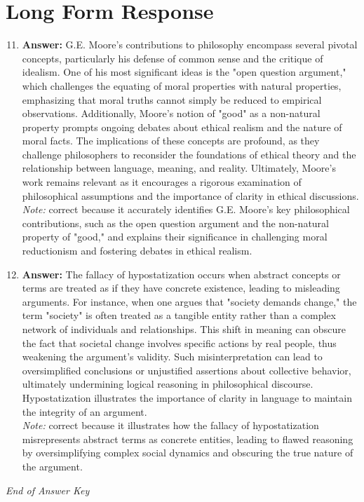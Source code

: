 \documentclass[12pt]{article}
\begin{document}
\section*{Long Form Response}
\begin{enumerate}[label=\arabic*.]
\setcounter{enumi}{10}
\item \textbf{Answer:} G.E. Moore's contributions to philosophy encompass several pivotal concepts, particularly his defense of common sense and the critique of idealism. One of his most significant ideas is the "open question argument," which challenges the equating of moral properties with natural properties, emphasizing that moral truths cannot simply be reduced to empirical observations. Additionally, Moore's notion of "good" as a non-natural property prompts ongoing debates about ethical realism and the nature of moral facts. The implications of these concepts are profound, as they challenge philosophers to reconsider the foundations of ethical theory and the relationship between language, meaning, and reality. Ultimately, Moore's work remains relevant as it encourages a rigorous examination of philosophical assumptions and the importance of clarity in ethical discussions.
\\ \textit{Note:} correct because it accurately identifies G.E. Moore's key philosophical contributions, such as the open question argument and the non-natural property of "good," and explains their significance in challenging moral reductionism and fostering debates in ethical realism.
\item \textbf{Answer:} The fallacy of hypostatization occurs when abstract concepts or terms are treated as if they have concrete existence, leading to misleading arguments. For instance, when one argues that "society demands change," the term "society" is often treated as a tangible entity rather than a complex network of individuals and relationships. This shift in meaning can obscure the fact that societal change involves specific actions by real people, thus weakening the argument's validity. Such misinterpretation can lead to oversimplified conclusions or unjustified assertions about collective behavior, ultimately undermining logical reasoning in philosophical discourse. Hypostatization illustrates the importance of clarity in language to maintain the integrity of an argument.
\\ \textit{Note:} correct because it illustrates how the fallacy of hypostatization misrepresents abstract terms as concrete entities, leading to flawed reasoning by oversimplifying complex social dynamics and obscuring the true nature of the argument.
\end{enumerate}

\vfill
\noindent\textit{End of Answer Key}
\end{document}
